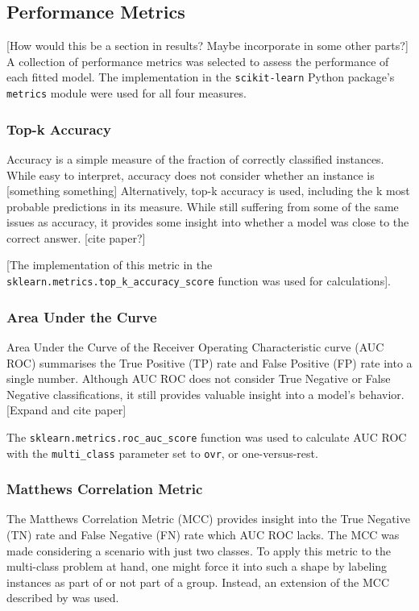 




\subsection{Performance Metrics}
[How would this be a section in results? Maybe incorporate in some other parts?]
A collection of performance metrics was selected to assess the performance of each fitted model.
The implementation in the \verb|scikit-learn| Python package's \verb|metrics| module were used for all four measures.

\subsubsection{Top-k Accuracy}
Accuracy is a simple measure of the fraction of correctly classified instances.
While easy to interpret, accuracy does not consider whether an instance is [something something] \cite{acc:bad}
Alternatively, top-k accuracy is used, including the k most probable predictions in its measure.
While still suffering from some of the same issues as accuracy, it provides some insight into whether a model was close to the correct answer. [cite paper?]

[The implementation of this metric in the \verb|sklearn.metrics.top_k_accuracy_score| function was used for calculations].

\subsubsection{Area Under the Curve}
Area Under the Curve of the Receiver Operating Characteristic curve (AUC ROC) summarises the True Positive (TP) rate and False Positive (FP) rate into a single number.
Although AUC ROC does not consider True Negative or False Negative classifications, it still provides valuable insight into a model's behavior.
[Expand and cite paper]

The \verb|sklearn.metrics.roc_auc_score| function was used to calculate AUC ROC with the \verb|multi_class| parameter set to \verb|ovr|, or one-versus-rest.

\subsubsection{Matthews Correlation Metric}
The Matthews Correlation Metric (MCC) provides insight into the True Negative (TN) rate and False Negative (FN) rate \cite{mcc:paper} which AUC ROC lacks.
The MCC was made considering a scenario with just two classes.
To apply this metric to the multi-class problem at hand, one might force it into such a shape by labeling instances as part of or not part of a group.
Instead, an extension of the MCC described by \cite{mcc:multi} was used.

